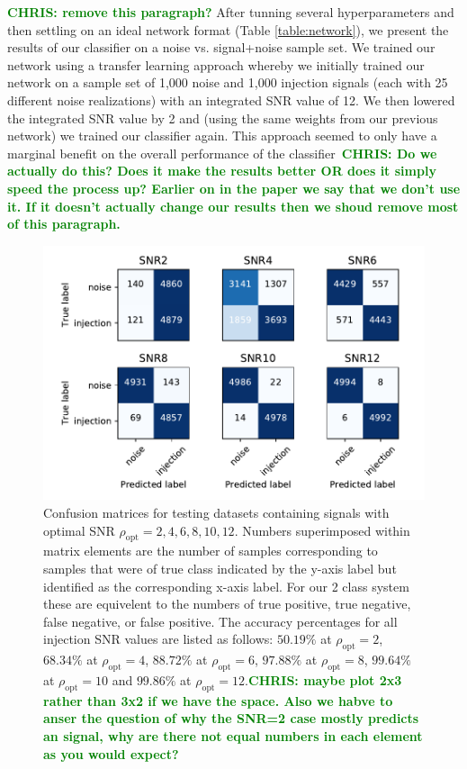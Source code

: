 \documentclass[%
showpacs,
 amsmath,amssymb,
 aps,
 twocolumn,
 prl,
 reprint,
floatfix,
]{revtex4-1}
\newcommand{\optsnr}{\rho_{\mathrm{opt}}}
\newcommand{\chris}[1]{\textbf{\textcolor{green}{CHRIS: #1}}}
\begin{document}
%
%
\chris{remove this paragraph?} After tunning several hyperparameters and then settling on
an ideal network format (Table \ref{table:network}), we present the results of
our classifier on a noise vs. signal+noise sample set. We trained our network
using a transfer learning approach whereby we initially trained our network on
a sample set of 1,000 noise and 1,000 injection signals (each with 25 different
noise realizations) with an integrated SNR value of 12. We then lowered the
integrated SNR value by 2 and (using the same weights from our previous
network) we trained our classifier again. This approach seemed to only have a
marginal benefit on the overall performance of the classifier~\chris{Do we
actually do this? Does it make the results better OR does it simply speed the
process up? Earlier on in the paper we say that we don't use it. If it doesn't
actually change our results then we shoud remove most of this paragraph.}  

%
%
\begin{figure}[]
\includegraphics[width=\columnwidth] {figures/confusion_matrix.pdf}
\caption{Confusion matrices for testing datasets containing signals with
optimal SNR $\rho_{\mathrm{opt}}=2,4,6,8,10,12$.  Numbers superimposed within
matrix elements are the number of samples corresponding to samples that were of
true class indicated by the y-axis label but identified as the corresponding
x-axis label. For our 2 class system these are equivelent to the numbers of
true positive, true negative, false negative, or false positive. The accuracy
percentages for all injection SNR values are listed as follows: $50.19\%$ at
$\optsnr=2$, $68.34\%$ at $\optsnr=4$, $88.72\%$ at $\optsnr=6$, $97.88\%$ at
$\optsnr=8$, $99.64\%$ at $\optsnr=10$ and $99.86\%$ at
$\optsnr=12$.\chris{maybe plot 2x3 rather than 3x2 if we have the space. Also
we habve to anser the question of why the SNR=2 case mostly predicts an signal,
why are there not equal numbers in each element as you would
expect?}\label{fig:confusion}}
\end{figure}
\end{document}
